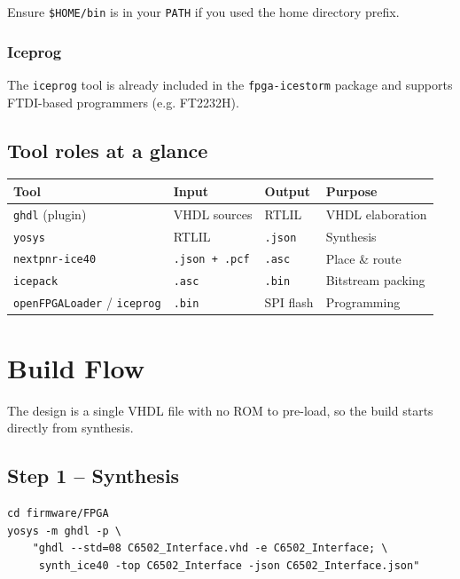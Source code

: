 \documentclass[11pt,a4paper]{article}
\newcommand{\cmd}[1]{\texttt{#1}}
\newcommand{\file}[1]{\texttt{#1}}
\begin{document}
Ensure \file{\$HOME/bin} is in your \cmd{PATH} if you used the home directory prefix.

\subsubsection{Iceprog}
The \cmd{iceprog} tool is already included in the \cmd{fpga-icestorm} package and supports FTDI-based programmers (e.g. FT2232H).

\subsection{Tool roles at a glance}

\begin{center}
\begin{tabular}{llll}
\toprule
\textbf{Tool} & \textbf{Input} & \textbf{Output} & \textbf{Purpose} \\
\midrule
\cmd{ghdl} (plugin)         & VHDL sources         & RTLIL            & VHDL elaboration \\
\cmd{yosys}                 & RTLIL                & \file{.json}     & Synthesis \\
\cmd{nextpnr-ice40}         & \file{.json + .pcf}  & \file{.asc}      & Place \& route \\
\cmd{icepack}               & \file{.asc}          & \file{.bin}      & Bitstream packing \\
\cmd{openFPGALoader} / \cmd{iceprog} & \file{.bin} & SPI flash        & Programming \\
\bottomrule
\end{tabular}
\end{center}

\section{Build Flow}

The design is a single VHDL file with no ROM to pre-load, so the build
starts directly from synthesis.

\subsection{Step 1 -- Synthesis}

\begin{lstlisting}[style=shell,caption={Synthesis with Yosys and the GHDL plugin}]
cd firmware/FPGA
yosys -m ghdl -p \
    "ghdl --std=08 C6502_Interface.vhd -e C6502_Interface; \
     synth_ice40 -top C6502_Interface -json C6502_Interface.json"
\end{lstlisting}
\end{document}
